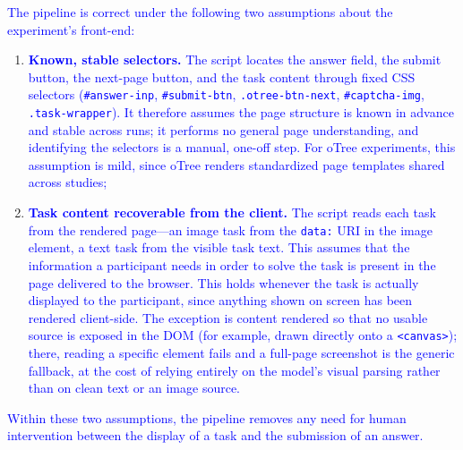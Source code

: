\documentclass[12pt,a4paper]{article}
\newcommand{\blue}[1]{\textcolor{blue}{#1}}
\begin{document}
\blue{The pipeline is correct under the following two assumptions about the experiment's front-end:}

\begin{enumerate}
    \item \blue{\textbf{Known, stable selectors.} The script locates the answer field, the submit button, the next-page button, and the task content through fixed CSS selectors (\texttt{\#answer-inp}, \texttt{\#submit-btn}, \texttt{.otree-btn-next}, \texttt{\#captcha-img}, \texttt{.task-wrapper}). It therefore assumes the page structure is known in advance and stable across runs; it performs no general page understanding, and identifying the selectors is a manual, one-off step. For oTree experiments, this assumption is mild, since oTree renders standardized page templates shared across studies;}

    \item \blue{\textbf{Task content recoverable from the client.} The script reads each task from the rendered page---an image task from the \texttt{data:} URI in the image element, a text task from the visible task text. This assumes that the information a participant needs in order to solve the task is present in the page delivered to the browser. This holds whenever the task is actually displayed to the participant, since anything shown on screen has been rendered client-side. The exception is content rendered so that no usable source is exposed in the DOM (for example, drawn directly onto a \texttt{<canvas>}); there, reading a specific element fails and a full-page screenshot is the generic fallback, at the cost of relying entirely on the model's visual parsing rather than on clean text or an image source.}
\end{enumerate}

\blue{Within these two assumptions, the pipeline removes any need for human intervention between the display of a task and the submission of an answer.}
\end{document}
